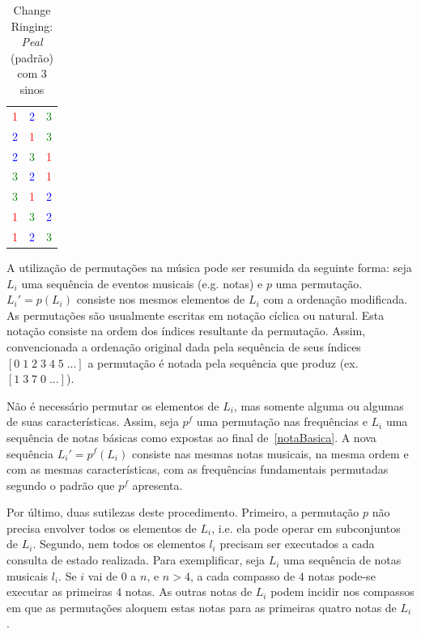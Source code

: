 \begin{table}[htpq!]
\centering
\caption{Change Ringing: \emph{Peal} (padrão) com 3 sinos}
\begin{tabular}{l c r}
\textcolor{red}{1} & \textcolor{blue}{2} & \textcolor{green}{3} \\
\textcolor{blue}{2} & \textcolor{red}{1} & \textcolor{green}{3} \\
\textcolor{blue}{2} & \textcolor{green}{3} & \textcolor{red}{1} \\
\textcolor{green}{3} & \textcolor{blue}{2} & \textcolor{red}{1} \\
\textcolor{green}{3} & \textcolor{red}{1} & \textcolor{blue}{2} \\
\textcolor{red}{1} & \textcolor{green}{3} & \textcolor{blue}{2} \\
\textcolor{red}{1} & \textcolor{blue}{2} & \textcolor{green}{3}
\end{tabular}
\label{tab:change}
\end{table}


A utilização de permutações na música pode ser resumida da seguinte forma:
seja $L_i$ uma sequência de eventos musicais (e.g. notas) e $p$ uma permutação.
$L_i'=p(L_i)$ consiste nos mesmos elementos de $L_i$ com a ordenação
modificada.
As permutações são usualmente escritas em notação cíclica ou natural. 
Esta notação consiste na ordem dos índices 
resultante da permutação. Assim,
convencionada a ordenação original dada pela sequência de seus índices $[0\;1\;2\;3\;4\;5\;...]$ a permutação é notada pela sequência que produz (ex. $[1\;3\;7\;0\;...]$).

Não é necessário permutar os elementos de $L_i$, mas somente
alguma ou algumas de suas características. Assim, seja $p^f$ uma permutação 
nas frequências e $L_i$ uma sequência de notas básicas como expostas
ao final de~\ref{notaBasica}. A nova sequência $L_i'=p^f(L_i)$ consiste nas mesmas
notas musicais, na mesma ordem e com as mesmas características, com as frequências fundamentais permutadas segundo o padrão que $p^f$ apresenta.

Por último, duas sutilezas deste procedimento.
Primeiro, a permutação $p$ não precisa envolver todos os elementos de $L_i$, i.e. ela
pode operar em subconjuntos de $L_i$. Segundo, nem todos os elementos $l_i$ precisam ser executados a cada consulta de estado realizada.
Para exemplificar, seja $L_i$ 
uma sequência de notas musicais $l_i$. 
Se $i$ vai de $0$ a $n$, e $n>4$, a cada compasso
de $4$ notas pode-se executar as primeiras $4$ notas. As outras notas de
$L_i$ podem incidir nos compassos em que as permutações aloquem
estas notas para as primeiras quatro notas de $L_i$.

